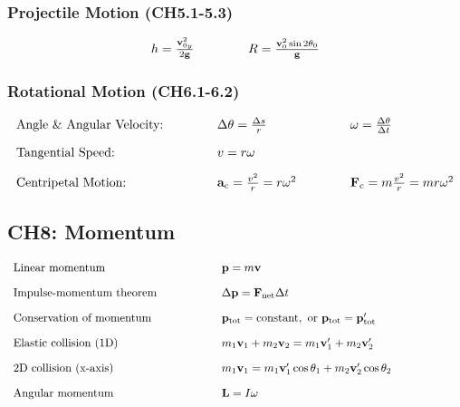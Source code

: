 \documentclass[12pt,a4paper]{article}
\begin{document}
\subsubsection{Projectile Motion (CH5.1-5.3)}
\begin{align*}
\begin{array}{l@{\hspace{1.5cm}}l}
h=\frac{\mathbf{v}_{0y}^2}{2\mathbf{g}} & R=\frac{\mathbf{v}_0^2 \sin 2\theta_0}{\mathbf{g}}
\end{array}
\end{align*}

\subsubsection{Rotational Motion (CH6.1-6.2)}
\begin{align*}
\begin{array}{l@{\hspace{1.5cm}}l@{\hspace{1.5cm}}l}
\text{Angle \& Angular Velocity:} & \Delta \theta=\frac{\Delta s}{r} & \omega=\frac{\Delta \theta}{\Delta t} \\[1em]
\text{Tangential Speed:} & v=r\omega & \\[1em]
\text{Centripetal Motion:} & \mathbf{a}_{\mathrm{c}}=\frac{v^2}{r}=r\omega^2 & \mathbf{F}_{\mathrm{c}}=m\frac{v^2}{r}=mr\omega^2
\end{array}
\end{align*}

\subsection{CH8: Momentum}
\begin{align*}
\begin{array}{l@{\hspace{2cm}}l@{\hspace{2cm}}l}
\text{Linear momentum} & \mathbf{p}=m \mathbf{v} & \\[1em]
\text{Impulse-momentum theorem} & \Delta \mathbf{p}=\mathbf{F}_{\text{net}} \Delta t & \\[1em]
\text{Conservation of momentum} & \mathbf{p}_{\text{tot}}= \text{constant}, \text{ or } \mathbf{p}_{\text{tot}}=\mathbf{p}_{\text{tot}}^{\prime} & \\[1em]
\text{Elastic collision (1D)} & m_1 \mathbf{v}_1+m_2 \mathbf{v}_2=m_1 \mathbf{v}_1^{\prime}+m_2 \mathbf{v}_2^{\prime} & \\[1em]
\text{2D collision (x-axis)} & m_1\mathbf{v}_1=m_1\mathbf{v}_1^{\prime}\cos\theta_1+m_2\mathbf{v}_2^{\prime}\cos\theta_2 & \\[1em]
\text{Angular momentum} & \mathbf{L}=I \omega &
\end{array}
\end{align*}
\end{document}
